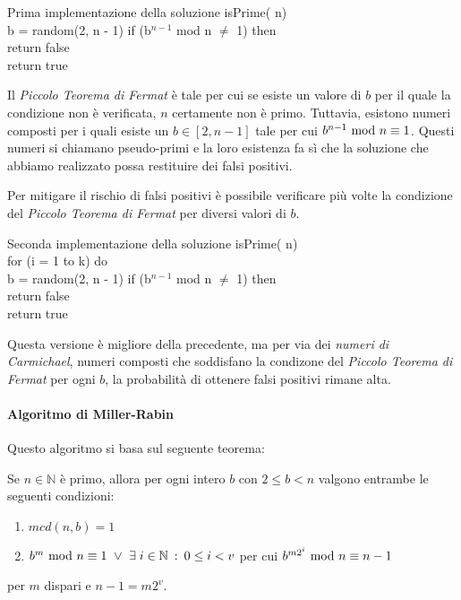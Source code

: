 \begin{minicode}{Prima implementazione della soluzione}
\ind{} isPrime( n)\\
     b = random(2, n - 1)\hfill{}
    \indf if (b$^{n - 1}$ mod n $\neq$ 1) then\\
        return false\\
    \indf return true
\end{minicode}

\noindent
Il \emph{Piccolo Teorema di Fermat} è tale per cui se esiste un valore di $b$
per il quale la condizione non è verificata, $n$ certamente non è primo.
Tuttavia, esistono numeri composti per i quali esiste un $b\in[2,n-1]$ tale
per cui $b^{n-1}\ \mathrm{mod}\ n\equiv 1$. Questi numeri si chiamano pseudo-primi e
la loro esistenza fa sì che la soluzione che abbiamo realizzato possa
restituire dei falsi positivi.

Per mitigare il rischio di falsi positivi è possibile verificare più volte
la condizione del \emph{Piccolo Teorema di Fermat} per diversi valori di $b$.

\begin{minicode}{Seconda implementazione della soluzione}
\ind{} isPrime( n)\\
    \indf for (i = 1 to k) do\\
         b = random(2, n - 1)\hfill{}
        \indff if (b$^{n - 1}$ mod n $\neq$ 1) then\\
            return false\\
    \indf return true
\end{minicode}

\noindent
Questa versione è migliore della precedente, ma per via dei \emph{numeri di
Carmichael}, numeri composti che soddisfano la condizone del
\emph{Piccolo Teorema di Fermat} per ogni $b$, la probabilità di ottenere falsi
positivi rimane alta.

\paragraph{Algoritmo di Miller-Rabin}
Questo algoritmo si basa sul seguente teorema:
\begin{definition}
    Se $n\in\mathbb{N}$ è primo, allora per ogni intero $b$ con $2\leq b<n$
    valgono entrambe le seguenti condizioni:
    \begin{enumerate}
        \item $mcd(n,b)=1$
        \item $b^m\ \mathrm{mod}\ n\equiv 1\ \vee\ \exists\; i\in\mathbb{N}\::\:0\leq
        i<v$ per cui $b^{m2^i}\ \mathrm{mod}\ n\equiv n-1$
    \end{enumerate}
    per $m$ dispari e $n-1=m2^v$.
\end{definition}

